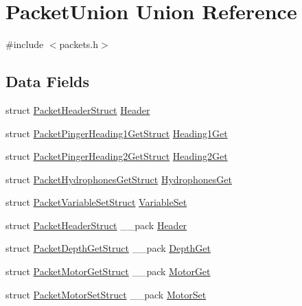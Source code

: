 \hypertarget{union_packet_union}{}\section{Packet\+Union Union Reference}
\label{union_packet_union}


{\ttfamily \#include $<$packets.\+h$>$}

\subsection*{Data Fields}
\begin{DoxyCompactItemize}
\item 
struct \hyperlink{struct_packet_header_struct}{Packet\+Header\+Struct} \hyperlink{union_packet_union_ab201af50281aff5ed4f984f994938007}{Header}
\item 
struct \hyperlink{struct_packet_pinger_heading1_get_struct}{Packet\+Pinger\+Heading1\+Get\+Struct} \hyperlink{union_packet_union_a466137506a1af4d846a3906eea631d18}{Heading1\+Get}
\item 
struct \hyperlink{struct_packet_pinger_heading2_get_struct}{Packet\+Pinger\+Heading2\+Get\+Struct} \hyperlink{union_packet_union_a595ca3a8c11316dd556c857bbcc090ff}{Heading2\+Get}
\item 
struct \hyperlink{struct_packet_hydrophones_get_struct}{Packet\+Hydrophones\+Get\+Struct} \hyperlink{union_packet_union_a4d04f6e9b20e542b2d759220c2a8dc2e}{Hydrophones\+Get}
\item 
struct \hyperlink{struct_packet_variable_set_struct}{Packet\+Variable\+Set\+Struct} \hyperlink{union_packet_union_a02290ae7707dc7a42bec0fb64ccd736d}{Variable\+Set}
\item 
struct \hyperlink{struct_packet_header_struct}{Packet\+Header\+Struct} \+\_\+\+\_\+pack \hyperlink{union_packet_union_acbbd8a011a1defa601de078f4c4bab97}{Header}
\item 
struct \hyperlink{struct_packet_depth_get_struct}{Packet\+Depth\+Get\+Struct} \+\_\+\+\_\+pack \hyperlink{union_packet_union_a1e3518ac5318a26cf207a8205b8cee9d}{Depth\+Get}
\item 
struct \hyperlink{struct_packet_motor_get_struct}{Packet\+Motor\+Get\+Struct} \+\_\+\+\_\+pack \hyperlink{union_packet_union_a7495b8796840522d1935d7342a5d462f}{Motor\+Get}
\item 
struct \hyperlink{struct_packet_motor_set_struct}{Packet\+Motor\+Set\+Struct} \+\_\+\+\_\+pack \hyperlink{union_packet_union_a956769d4d38d30395db4f058d7b4ca83}{Motor\+Set}

\end{DoxyCompactItemize}
